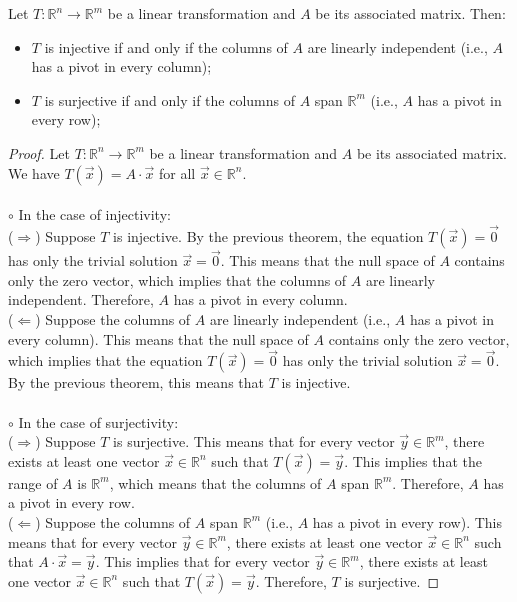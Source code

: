 \begin{theorem}
    Let $T: \mathbb{R}^n \to \mathbb{R}^m$ be a linear transformation and $A$ be its associated matrix. Then:
    \begin{itemize}[itemsep=1pt,label=$\circ$]
        \item $T$ is injective if and only if the columns of $A$ are linearly independent (i.e., $A$ has a pivot in every column);
        \item $T$ is surjective if and only if the columns of $A$ span $\mathbb{R}^m$ (i.e., $A$ has a pivot in every row);
    \end{itemize}
\end{theorem}
\begin{proof}
    Let $T: \mathbb{R}^n \to \mathbb{R}^m$ be a linear transformation and $A$ be its associated matrix. We have $T(\vec{x}) = A \cdot \vec{x}$ for all $\vec{x} \in \mathbb{R}^n$. \\ \\
    $\circ$ In the case of injectivity: \\
    ($\Rightarrow$) Suppose $T$ is injective. By the previous theorem, the equation $T(\vec{x}) = \vec{0}$ has only the trivial solution $\vec{x} = \vec{0}$. This means that the null space of $A$ contains only the zero vector, which implies that the columns of $A$ are linearly independent. Therefore, $A$ has a pivot in every column. \\
    ($\Leftarrow$) Suppose the columns of $A$ are linearly independent (i.e., $A$ has a pivot in every column). This means that the null space of $A$ contains only the zero vector, which implies that the equation $T(\vec{x}) = \vec{0}$ has only the trivial solution $\vec{x} = \vec{0}$. By the previous theorem, this means that $T$ is injective. \\ \\
    $\circ$ In the case of surjectivity: \\
    ($\Rightarrow$) Suppose $T$ is surjective. This means that for every vector $\vec{y} \in \mathbb{R}^m$, there exists at least one vector $\vec{x} \in \mathbb{R}^n$ such that $T(\vec{x}) = \vec{y}$. This implies that the range of $A$ is $\mathbb{R}^m$, which means that the columns of $A$ span $\mathbb{R}^m$. Therefore, $A$ has a pivot in every row. \\
    ($\Leftarrow$) Suppose the columns of $A$ span $\mathbb{R}^m$ (i.e., $A$ has a pivot in every row). This means that for every vector $\vec{y} \in \mathbb{R}^m$, there exists at least one vector $\vec{x} \in \mathbb{R}^n$ such that $A \cdot \vec{x} = \vec{y}$. This implies that for every vector $\vec{y} \in \mathbb{R}^m$, there exists at least one vector $\vec{x} \in \mathbb{R}^n$ such that $T(\vec{x}) = \vec{y}$. Therefore, $T$ is surjective.
\end{proof}

